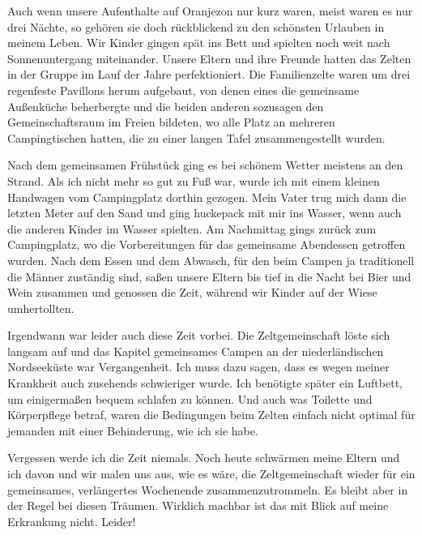 \documentclass[fontsize=14pt,a4paper,headinclude,DIV=calc,automark]{scrbook}
\begin{document}
Auch wenn unsere Aufenthalte auf Oranjezon nur kurz waren, meist waren es nur drei Nächte, so gehören sie doch rückblickend zu den schönsten Urlauben in meinem Leben. Wir Kinder gingen spät ins Bett und spielten noch weit nach Sonnenuntergang miteinander. Unsere Eltern und ihre Freunde hatten das Zelten in der Gruppe im Lauf der Jahre perfektioniert. Die Familienzelte waren um drei regenfeste Pavillons herum aufgebaut, von denen eines die gemeinsame Außenküche beherbergte und die beiden anderen sozusagen den Gemeinschaftsraum im Freien bildeten, wo alle Platz an mehreren Campingtischen hatten, die zu einer langen Tafel zusammengestellt wurden.

Nach dem gemeinsamen Frühstück ging es bei schönem Wetter meistens an den Strand. Als ich nicht mehr so gut zu Fuß war, wurde ich mit einem kleinen Handwagen vom Campingplatz dorthin gezogen. Mein Vater trug mich dann die letzten Meter auf den Sand und ging huckepack mit mir ins Wasser, wenn auch die anderen Kinder im Wasser spielten. Am Nachmittag gings zurück zum Campingplatz, wo die Vorbereitungen für das gemeinsame Abendessen getroffen wurden. Nach dem Essen und dem Abwasch, für den beim Campen ja traditionell die Männer zuständig sind, saßen unsere Eltern bis tief in die Nacht bei Bier und Wein zusammen und genossen die Zeit, während wir Kinder auf der Wiese umhertollten.

Irgendwann war leider auch diese Zeit vorbei. Die Zeltgemeinschaft löste sich langsam auf und das Kapitel gemeinsames Campen an der niederländischen Nordseeküste war Vergangenheit. Ich muss dazu sagen, dass es wegen meiner Krankheit auch zusehends schwieriger wurde. Ich benötigte später ein Luftbett, um einigermaßen bequem schlafen zu können. Und auch was Toilette und Körperpflege betraf, waren die Bedingungen beim Zelten einfach nicht optimal für jemanden mit einer Behinderung, wie ich sie habe.

Vergessen werde ich die Zeit niemals. Noch heute schwärmen meine Eltern und ich davon und wir malen uns aus, wie es wäre, die Zeltgemeinschaft wieder für ein gemeinsames, verlängertes Wochenende zusammenzutrommeln. Es bleibt aber in der Regel bei diesen Träumen. Wirklich machbar ist das mit Blick auf meine Erkrankung nicht. Leider!
\end{document}

